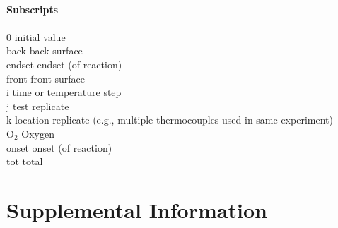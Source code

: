 \documentclass{book}
\begin{document}
\begin{tabbing}
\hspace{0.1in}            		\> \\
{\bf Subscripts}          	\> \\
\hspace{0.1in}            		\> \\
0     	                    			\> initial value \\
back         				\> back surface\\
endset         				\> endset (of reaction)\\
front         				\> front surface\\
i                          			\> time or temperature step\\
j                          			\> test replicate\\
k	                          		\> location replicate (e.g., multiple thermocouples used in same experiment)\\
O$_2$                         		\> Oxygen \\
onset                  			\> onset (of reaction)\\
tot                  				\> total\\
\end{tabbing}



\newpage
\chapter{Supplemental Information}
\label{SI}

\end{document}
